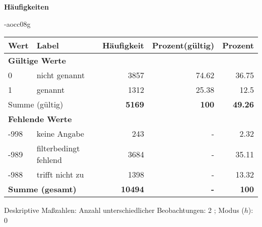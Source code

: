        		\vspace*{0.5cm}
                \noindent\textbf{Häufigkeiten}

                \vspace*{-\baselineskip}
					\begin{filecontents}{\jobname-aocc08g}
					\begin{longtable}{lXrrr}
					\toprule
					\textbf{Wert} & \textbf{Label} & \textbf{Häufigkeit} & \textbf{Prozent(gültig)} & \textbf{Prozent} \\
					\endhead
					\midrule
					\multicolumn{5}{l}{\textbf{Gültige Werte}}\\

					0 &
					\multicolumn{1}{X}{ nicht genannt   } &


					  \num{3857} &
					  \num[round-mode=places,round-precision=2]{74.62} &
					    \num[round-mode=places,round-precision=2]{36.75} \\

					1 &
					\multicolumn{1}{X}{ genannt   } &


					  \num{1312} &
					  \num[round-mode=places,round-precision=2]{25.38} &
					    \num[round-mode=places,round-precision=2]{12.5} \\
					\midrule
					\multicolumn{2}{l}{Summe (gültig)} &
					  \textbf{\num{5169}} &
					\textbf{\num{100}} &
					  \textbf{\num[round-mode=places,round-precision=2]{49.26}} \\
					\multicolumn{5}{l}{\textbf{Fehlende Werte}}\\
							-998 &
							keine Angabe &
							  \num{243} &
							 - &
							  \num[round-mode=places,round-precision=2]{2.32} \\
							-989 &
							filterbedingt fehlend &
							  \num{3684} &
							 - &
							  \num[round-mode=places,round-precision=2]{35.11} \\
							-988 &
							trifft nicht zu &
							  \num{1398} &
							 - &
							  \num[round-mode=places,round-precision=2]{13.32} \\
					\midrule
					\multicolumn{2}{l}{\textbf{Summe (gesamt)}} &
				      \textbf{\num{10494}} &
				    \textbf{-} &
				    \textbf{\num{100}} \\
					\bottomrule
					\end{longtable}
					\end{filecontents}
				\label{tableValues:aocc08g}
				\vspace*{-\baselineskip}
                    \begin{noten}
                	    \note{} Deskriptive Maßzahlen:
                	    Anzahl unterschiedlicher Beobachtungen: 2%
                	    ; 
                	      Modus ($h$): 0
                     \end{noten}

